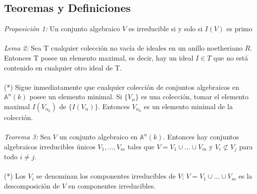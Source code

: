 \documentclass{article}
\newcommand{\A}{\mathbb{A}}
\begin{document}
\subsection*{Teoremas y Definiciones}
\textit{Proposición 1:} Un conjunto algebraico $V$ es irreducible si y solo si $I(V)$ es primo
\\
\\
\textit{Lema 2:} Sea \textsc{T} cualquier colección no vacía de ideales en un anillo noetheriano $R$. Entonces \textsc{T} posee un elemento maximal, es decir, hay un ideal $I \in T$ que no está contenido en cualquier otro ideal de \textsc{T}.
\\
\\
(*) Sigue inmediatamente que cualquier colección de conjuntos algebraicos en $\A^{n}(k)$ posee un elemento minimal. Si $\{V_{\alpha} \}$ es una colección, tomar el elemento maximal $I(V_{\alpha_{0}})$ de $\{I(V_{\alpha}) \}$. Entonces $V_{\alpha_{0}}$ es un elemento minimal de la colección.
\\
\\
\textit{Teorema 3:} Sea $V$ un conjunto algebraico en $\A^{n}(k)$. Entonces hay conjuntos algebraicos irreducibles únicos $V_1, \dots, V_m$ tales que $V=V_1 \cup \dots \cup V_m$ y $V_i \not\subset V_j$ para todo $i \neq j$.
\\
\\
(*) Los $V_i$ se denominan los componentes irreducibles de $V$; $V=V_1 \cup \dots \cup V_m$ es la descomposición de $V$ en componentes irreducibles.
\end{document}
